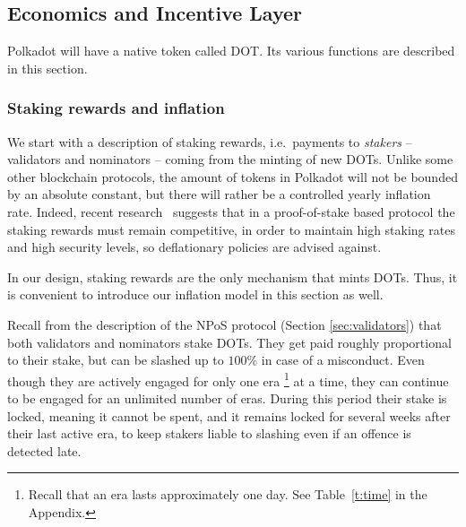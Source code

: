 \documentclass{article}
\begin{document}
\subsection{Economics and Incentive Layer}\label{sec:economics}

Polkadot will have a native token called DOT. Its various functions are described in this section.


\subsubsection{Staking rewards and inflation}\label{sec:inflation}

We start with a description of staking rewards, i.e.~payments to \emph{stakers} -- validators and nominators -- 
coming from the minting of new DOTs. 
Unlike some other blockchain protocols, the amount of tokens in Polkadot will not be bounded by an absolute constant, but there will rather be a controlled yearly inflation rate. Indeed, recent research~\cite{chitra2019competitive} suggests that in a proof-of-stake based protocol the staking rewards must remain competitive, in order to maintain high staking rates and high security levels, so deflationary policies are advised against. 

In our design, staking rewards are the only mechanism that mints DOTs. 
Thus, it is convenient to introduce our inflation model in this section as well. 

Recall from the description of the NPoS protocol (Section \ref{sec:validators}) that both validators and nominators stake DOTs. 
They get paid roughly proportional to their stake, but can be slashed up to $100\%$ in case of a misconduct. 
Even though they are actively engaged for only one era%
\footnote{Recall that an era lasts approximately one day. See Table~\ref{t:time} in the Appendix.} 
at a time, they can continue to be engaged for an unlimited number of eras. 
During this period their stake is locked, meaning it cannot be spent, and it remains locked for several weeks after their last active era, to keep stakers liable to slashing even if an offence is detected late.
\end{document}

